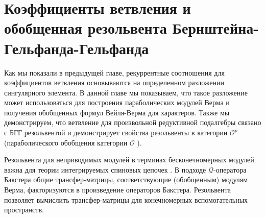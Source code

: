
\chapter{Коэффициенты ветвления и обобщенная резольвента Бернштейна-Гельфанда-Гельфанда}
\label{cha:BGG}

Как мы показали в предыдущей главе, рекуррентные соотношения для коэффициентов ветвления основываются на определенном разложении сингулярного элемента. В данной главе мы показываем, что такое разложение может использоваться для построения параболических модулей Верма и получения обобщенных формул Вейля-Верма для характеров. Также мы демонстрируем, что ветвление для произвольной редуктивной подалгебры связано с БГГ резольвентой и демонстрирует свойства резольвенты в категории $\mathcal{O}^{p}$ \cite{lepowsky1977generalization} (параболического обобщения категории $\mathcal{O}$ \cite{bernstein1976category}).

Резольвента для неприводимых модулей в терминах бесконечномерных модулей важна для теории интегрируемых спиновых цепочек \cite{derk1008}. В подходе  $\mathcal{Q}$-оператора Бакстера \cite{derk09} общие трансфер-матрицы, соответствующие (обобщенным) модулям Верма, факторизуются в произведение операторов Бакстера. Резольвента позволяет вычислить трансфер-матрицы для конечномерных вспомогательных пространств.

